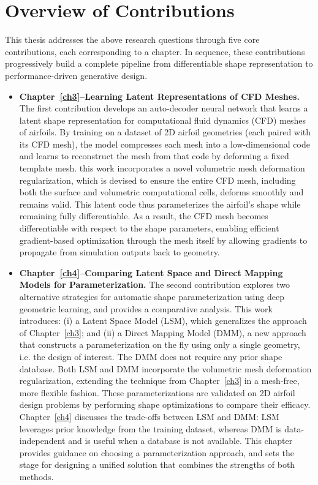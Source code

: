 \section{Overview of Contributions}
This thesis addresses the above research questions through five core contributions, each corresponding to a chapter. In sequence, these contributions progressively build a complete pipeline from differentiable shape representation to performance-driven generative design.

\begin{itemize}
    \item \textbf{Chapter~\ref{ch3}--Learning Latent Representations of CFD Meshes.} The first contribution develops an auto-decoder neural network that learns a latent shape representation for computational fluid dynamics (CFD) meshes of airfoils. By training on a dataset of 2D airfoil geometries (each paired with its CFD mesh), the model compresses each mesh into a low-dimensional code and learns to reconstruct the mesh from that code by deforming a fixed template mesh. this work incorporates a novel volumetric mesh deformation regularization, which is devised to ensure the entire CFD mesh, including both the surface and volumetric computational cells, deforms smoothly and remains valid. This latent code thus parameterizes the airfoil’s shape while remaining fully differentiable. As a result, the CFD mesh becomes differentiable with respect to the shape parameters, enabling efficient gradient-based optimization through the mesh itself by allowing gradients to propagate from simulation outputs back to geometry.

    \item \textbf{Chapter~\ref{ch4}--Comparing Latent Space and Direct Mapping Models for Parameterization.} The second contribution explores two alternative strategies for automatic shape parameterization using deep geometric learning, and provides a comparative analysis. This work introduces: (i) a Latent Space Model (LSM), which generalizes the approach of Chapter~\ref{ch3}; and (ii) a Direct Mapping Model (DMM), a new approach that constructs a parameterization on the fly using only a single geometry, i.e. the design of interest. The DMM does not require any prior shape database. Both LSM and DMM incorporate the volumetric mesh deformation regularization, extending the technique from Chapter~\ref{ch3} in a mesh-free, more flexible fashion. These parameterizations are validated on 2D airfoil design problems by performing shape optimizations to compare their efficacy. Chapter~\ref{ch4} discusses the trade-offs between LSM and DMM: LSM leverages prior knowledge from the training dataset, whereas DMM is data-independent and is useful when a database is not available. This chapter provides guidance on choosing a parameterization approach, and sets the stage for designing a unified solution that combines the strengths of both methods.


\end{itemize}

